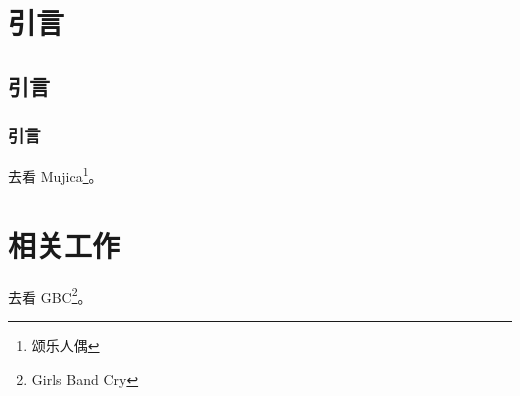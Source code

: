 \documentclass{pkuthesis}
\begin{document}
\section{引言}
\subsection{引言}
\subsubsection{引言}
去看 Mujica\footnote{颂乐人偶}\cite{noauthor_bang_2025}。
\section{相关工作}
去看 GBC\footnote{Girls Band Cry}。
\printbibliography
\end{document}
